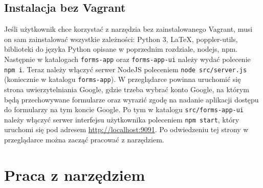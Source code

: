 \subsection{Instalacja bez Vagrant}
Jeśli użytkownik chce korzystać z narzędzia bez zainstalowanego Vagrant, musi on
sam zainstalować wszystkie zależności: Python 3, \LaTeX{}, poppler-utils, biblioteki
do języka Python opisane w poprzednim rozdziale, nodejs, npm. Następnie w katalogach
\texttt{forms-app} oraz \texttt{forms-app-ui} należy wydać polecenie \texttt{npm i}.
Teraz należy włączyć serwer NodeJS poleceniem \texttt{node src/server.js} 
(koniecznie w katalogu \texttt{forms-app}). W przeglądarce powinna uruchomić się
strona uwierzytelniania Google, gdzie trzeba wybrać konto Google, na którym
będą przechowywane formularze oraz wyrazić zgodę na nadanie aplikacji dostępu do
formularzy na tym koncie Google. Po tym w katalogu \texttt{src/forms-app-ui}
należy włączyć serwer interfejsu użytkownika poleceniem \texttt{npm start}, który
uruchomi się pod adresem \href{http://localhost:9091}{http://localhost:9091}.
Po odwiedzeniu tej strony w przeglądarce można zacząć pracować z narzędziem.

\section{Praca z narzędziem}

